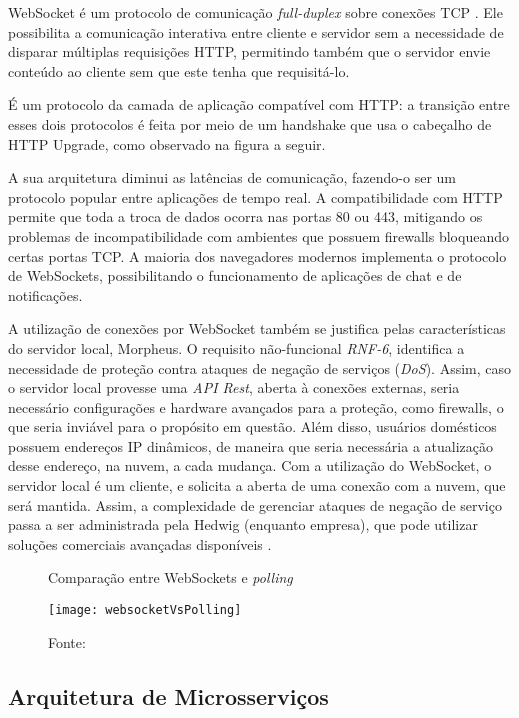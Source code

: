 WebSocket é um protocolo de comunicação \emph{full-duplex} sobre conexões TCP \cite{rfc6455}. Ele possibilita a comunicação interativa entre cliente e servidor sem a necessidade de disparar múltiplas requisições HTTP, permitindo também que o servidor envie conteúdo ao cliente sem que este tenha que requisitá-lo.

É um protocolo da camada de aplicação compatível com HTTP: a transição entre esses dois protocolos é feita por meio de um handshake que usa o cabeçalho de HTTP Upgrade, como observado na figura a seguir.

A sua arquitetura diminui as latências de comunicação, fazendo-o ser um protocolo popular entre aplicações de tempo real. A compatibilidade com HTTP permite que toda a troca de dados ocorra nas portas 80 ou 443, mitigando os problemas de incompatibilidade com ambientes que possuem firewalls bloqueando certas portas TCP. A maioria dos navegadores modernos implementa o protocolo de WebSockets, possibilitando o funcionamento de aplicações de chat e de notificações.

A utilização de conexões por WebSocket também se justifica pelas características do servidor local, Morpheus. O requisito não-funcional \emph{RNF-6}, identifica a necessidade de proteção contra ataques de negação de serviços (\emph{DoS}). Assim, caso o servidor local provesse uma \emph{API Rest}, aberta à conexões externas, seria necessário configurações e hardware avançados para a proteção, como firewalls, o que seria inviável para o propósito em questão. Além disso, usuários domésticos possuem endereços IP dinâmicos, de maneira que seria necessária a atualização desse endereço, na nuvem, a cada mudança. Com a utilização do WebSocket, o servidor local é um cliente, e solicita a aberta de uma conexão com a nuvem, que será mantida. Assim, a complexidade de gerenciar ataques de negação de serviço passa a ser administrada pela Hedwig (enquanto empresa), que pode utilizar soluções comerciais avançadas disponíveis \cite{akamai}.

\begin{figure}[H]
	\centering
	\caption{Comparação entre WebSockets e \emph{polling}}
  \texttt{[image: websocketVsPolling]}
	\caption*{Fonte: \cite{lubbers}}
\label{fig:websocketVsPolling}
\end{figure}

\subsection{Arquitetura de Microsserviços}

